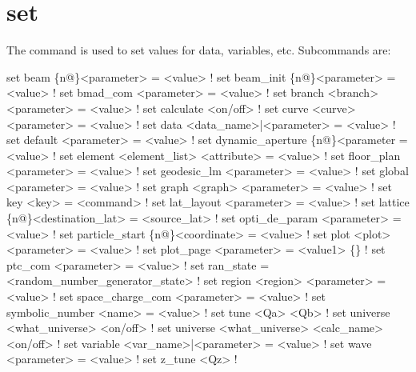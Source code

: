 {{%
\section{set}
\label{s:set}

The  command is used to set values for data, variables, etc. Subcommands are:
\begin{example}
  set beam \{n@\}<parameter> = <value>                        ! 
  set beam_init \{n@\}<parameter> = <value>                   ! 
  set bmad_com <parameter> = <value>                        ! 
  set branch <branch> <parameter> = <value>                 ! 
  set calculate <on/off>                                    ! 
  set curve <curve> <parameter> = <value>                   ! 
  set data <data_name>|<parameter> = <value>                ! 
  set default <parameter> = <value>                         ! 
  set dynamic_aperture \{n@\}<parameter = <value>             ! 
  set element <element_list> <attribute> = <value>          ! 
  set floor_plan <parameter> = <value>                      ! 
  set geodesic_lm <parameter> = <value>                     ! 
  set global <parameter> = <value>                          ! 
  set graph <graph> <parameter> = <value>                   ! 
  set key <key> = <command>                                 ! 
  set lat_layout <parameter> = <value>                      ! 
  set lattice \{n@\}<destination_lat> = <source_lat>          ! 
  set opti_de_param <parameter> = <value>                   ! 
  set particle_start \{n@\}<coordinate> = <value>             ! 
  set plot <plot> <parameter> = <value>                     ! 
  set plot_page <parameter> = <value1> \{<value2>\}           ! 
  set ptc_com <parameter> = <value>                         ! 
  set ran_state = <random_number_generator_state>           ! 
  set region <region> <parameter> = <value>                 ! 
  set space_charge_com <parameter> = <value>                ! 
  set symbolic_number <name> = <value>                      ! 
  set tune <Qa> <Qb>                                        ! 
  set universe <what_universe> <on/off>                     ! 
  set universe <what_universe> <calc_name> <on/off>         ! 
  set variable <var_name>|<parameter> = <value>             ! 
  set wave <parameter> = <value>                            ! 
  set z_tune <Qz>                                           ! 
\end{example}

}}
